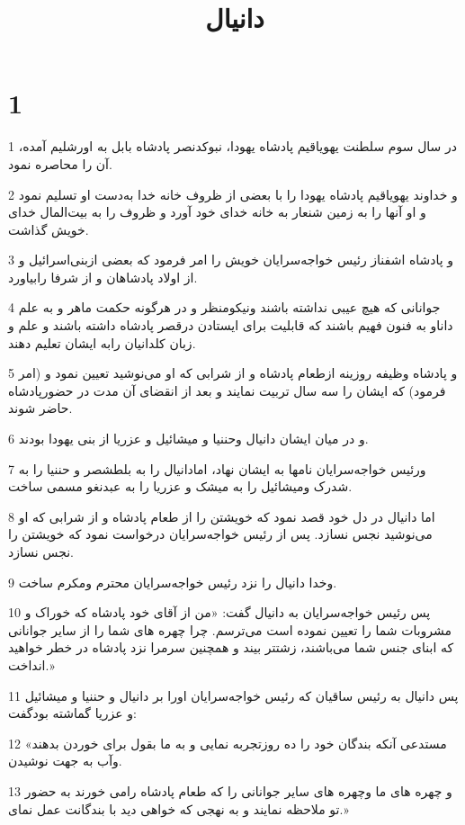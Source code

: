 

\title{دانيال}


\chapter{1}

\par 1 در سال سوم سلطنت یهویاقیم پادشاه یهودا، نبوکدنصر پادشاه بابل به اورشلیم آمده، آن را محاصره نمود.
\par 2 و خداوند یهویاقیم پادشاه یهودا را با بعضی از ظروف خانه خدا به‌دست او تسلیم نمود و او آنها را به زمین شنعار به خانه خدای خود آورد و ظروف را به بیت‌المال خدای خویش گذاشت.
\par 3 و پادشاه اشفناز رئیس خواجه‌سرایان خویش را امر فرمود که بعضی ازبنی‌اسرائیل و از اولاد پادشاهان و از شرفا رابیاورد.
\par 4 جوانانی که هیچ عیبی نداشته باشند ونیکومنظر و در هرگونه حکمت ماهر و به علم داناو به فنون فهیم باشند که قابلیت برای ایستادن درقصر پادشاه داشته باشند و علم و زبان کلدانیان رابه ایشان تعلیم دهند.
\par 5 و پادشاه وظیفه روزینه ازطعام پادشاه و از شرابی که او می‌نوشید تعیین نمود و (امر فرمود) که ایشان را سه سال تربیت نمایند و بعد از انقضای آن مدت در حضورپادشاه حاضر شوند.
\par 6 و در میان ایشان دانیال وحننیا و میشائیل و عزریا از بنی یهودا بودند.
\par 7 ورئیس خواجه‌سرایان نامها به ایشان نهاد، امادانیال را به بلطشصر و حننیا را به شدرک ومیشائیل را به میشک و عزریا را به عبدنغو مسمی ساخت.
\par 8 اما دانیال در دل خود قصد نمود که خویشتن را از طعام پادشاه و از شرابی که او می‌نوشید نجس نسازد. پس از رئیس خواجه‌سرایان درخواست نمود که خویشتن را نجس نسازد.
\par 9 وخدا دانیال را نزد رئیس خواجه‌سرایان محترم ومکرم ساخت.
\par 10 پس رئیس خواجه‌سرایان به دانیال گفت: «من از آقای خود پادشاه که خوراک و مشروبات شما را تعیین نموده است می‌ترسم. چرا چهره های شما را از سایر جوانانی که ابنای جنس شما می‌باشند، زشتتر بیند و همچنین سرمرا نزد پادشاه در خطر خواهید انداخت.»
\par 11 پس دانیال به رئیس ساقیان که رئیس خواجه‌سرایان اورا بر دانیال و حننیا و میشائیل و عزریا گماشته بودگفت:
\par 12 «مستدعی آنکه بندگان خود را ده روزتجربه نمایی و به ما بقول برای خوردن بدهند وآب به جهت نوشیدن.
\par 13 و چهره های ما وچهره های سایر جوانانی را که طعام پادشاه رامی خورند به حضور تو ملاحظه نمایند و به نهجی که خواهی دید با بندگانت عمل نمای.»
